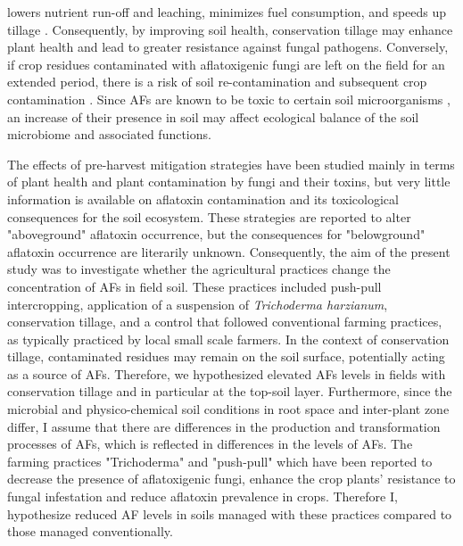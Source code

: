 \begin{refsection}
lowers nutrient run-off and leaching, minimizes fuel consumption, and speeds up tillage \citep{busari2015conservation}. Consequently, by improving soil health, conservation tillage may enhance plant health and lead to greater resistance against fungal pathogens. Conversely, if crop residues contaminated with aflatoxigenic fungi are left on the field for an extended period, there is a risk of soil re-contamination and subsequent crop contamination  \citep{fouche2020aflatoxins, accinelli2008aspergillus, angle1987aflatoxin}. Since AFs are known to be toxic to certain soil microorganisms \citep{burmeister1966survey, arai1967antimicrobial}, an increase of their presence in soil may affect ecological balance of the soil microbiome and associated functions.


The effects of pre-harvest mitigation strategies have been studied mainly in terms of plant health and plant contamination by fungi and their toxins, but very little information is available on aflatoxin contamination and its toxicological consequences for the soil ecosystem. These strategies are reported to alter "aboveground" aflatoxin occurrence, but the consequences for "belowground" aflatoxin occurrence are literarily unknown. Consequently, the aim of the present study was to investigate  whether the agricultural practices change the concentration of AFs in field soil. These practices included push-pull intercropping, application of a suspension of \textit{Trichoderma harzianum}, conservation tillage, and a control that followed conventional farming practices, as typically practiced by local small scale farmers. In the context of conservation tillage, contaminated residues may remain on the soil surface, potentially acting as a source of AFs. Therefore, we hypothesized elevated AFs levels in fields with conservation tillage and in particular at the top-soil layer. Furthermore, since the microbial and physico-chemical soil conditions in root space and inter-plant zone differ, I assume that there are differences in the production and transformation processes of AFs, which is reflected in differences in the levels of AFs. The farming practices "Trichoderma" and "push-pull" which have been reported to decrease the presence of aflatoxigenic fungi, enhance the crop plants’ resistance to fungal infestation and reduce aflatoxin prevalence in crops. Therefore I, hypothesize reduced AF levels in soils managed with these practices compared to those managed conventionally.


\end{refsection}
